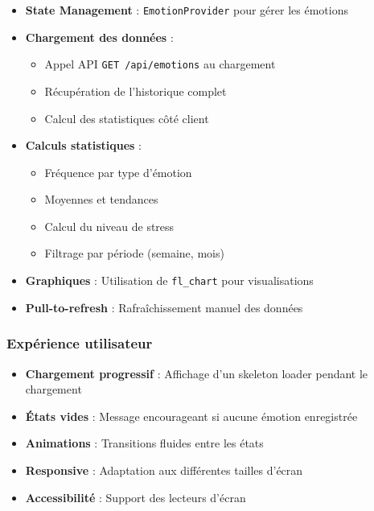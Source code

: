 \documentclass[a4paper,11pt]{report}
\begin{document}
\begin{itemize}
    \item \textbf{State Management} : \texttt{EmotionProvider} pour gérer les émotions
    \item \textbf{Chargement des données} :
    \begin{itemize}
        \item Appel API \texttt{GET /api/emotions} au chargement
        \item Récupération de l'historique complet
        \item Calcul des statistiques côté client
    \end{itemize}
    
    \item \textbf{Calculs statistiques} :
    \begin{itemize}
        \item Fréquence par type d'émotion
        \item Moyennes et tendances
        \item Calcul du niveau de stress
        \item Filtrage par période (semaine, mois)
    \end{itemize}
    
    \item \textbf{Graphiques} : Utilisation de \texttt{fl\_chart} pour visualisations
    \item \textbf{Pull-to-refresh} : Rafraîchissement manuel des données
\end{itemize}

\subsubsection{Expérience utilisateur}

\begin{itemize}
    \item \textbf{Chargement progressif} : Affichage d'un skeleton loader pendant le chargement
    \item \textbf{États vides} : Message encourageant si aucune émotion enregistrée
    \item \textbf{Animations} : Transitions fluides entre les états
    \item \textbf{Responsive} : Adaptation aux différentes tailles d'écran
    \item \textbf{Accessibilité} : Support des lecteurs d'écran
\end{itemize}
\end{document}
